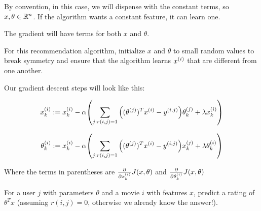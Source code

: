 By convention, in this case, we will dispense with the constant terms, so $x,\theta \in \mathbb{R}^n$.
If the algorithm wants a constant feature, it can learn one.

The gradient will have terms for both $x$ and $\theta$.

For this recommendation algorithm, initialize $x$ and $\theta$ to small random values
to break symmetry and ensure that the algorithm learns $x_{}^{(i)}$ that are different from one another.

Our gradient descent steps will look like this:

\[
    x_{k}^{(i)} := x_{k}^{(i)} - \alpha \qty(
        \sum_{j:r(i,j)=1} \qty((\theta_{}^{(j)})^T x_{}^{(i)} - y_{}^{(i,j)}) \theta_{k}^{(j)} 
        + \lambda x_{k}^{(i)}
    )
\]

\[
    \theta_{k}^{(i)} := x_{k}^{(i)} - \alpha \qty(
        \sum_{j:r(i,j)=1} \qty((\theta_{}^{(j)})^T x_{}^{(i)} - y_{}^{(i,j)}) x_{k}^{(j)} 
        + \lambda \theta_{k}^{(i)}
    )
\]

Where the terms in parentheses are $\pdv{x_{k}^{(i)}} J(x,\theta)$ and $\pdv{\theta_{k}^{(i)}} J(x,\theta)$

For a user $j$ with parameters $\theta$ and a movie $i$ with features $x$, predict a rating of $\theta^T x$
(assuming $r(i,j)=0$, otherwise we already know the answer!).
